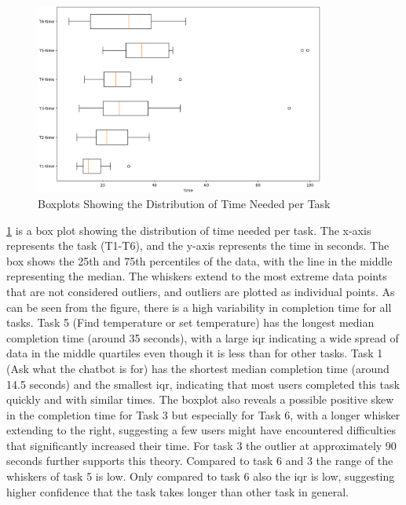 \begin{figure}[h]
    \centering
    \captionsetup{justification=centering}
    \includegraphics[width=0.85\textwidth]{graphics/time-boxplots.png}
    \caption{Boxplots Showing the Distribution of Time Needed per Task}
    \label{fig:task-boxplots}
\end{figure}

\cref{fig:task-boxplots} is a box plot showing the distribution of time needed per task. The x-axis represents the task (T1-T6), and the y-axis represents the time in seconds. The box shows the 25th and 75th percentiles of the data, with the line in the middle representing the median. The whiskers extend to the most extreme data points that are not considered outliers, and outliers are plotted as individual points. As can be seen from the figure, there is a high variability in completion time for all tasks. Task 5 (Find temperature or set temperature) has the longest median completion time (around 35 seconds), with a large \gls{iqr}  indicating a wide spread of data in the middle quartiles even though it is less than for other tasks. Task 1 (Ask what the chatbot is for) has the shortest median completion time (around 14.5 seconds) and the smallest \gls{iqr}, indicating that most users completed this task quickly and with similar times.
The boxplot also reveals a possible positive skew in the completion time for Task 3 but especially for Task 6, with a longer whisker extending to the right, suggesting a few users might have encountered difficulties that significantly increased their time.
For task 3 the outlier at approximately 90 seconds further supports this theory.
Compared to task 6 and 3 the range of the whiskers of task 5 is low. Only compared to task 6 also the \gls{iqr} is low, suggesting higher confidence that the task takes longer than other task in general.

